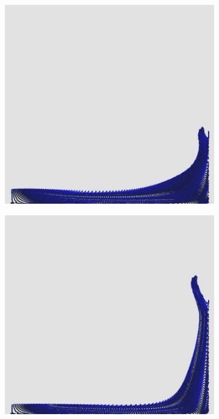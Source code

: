 \documentclass[12pt,a4paper,dvipsnames]{article}
\begin{document}
\begin{figure}[!ht]
\begin{subfigure}[!h]{0.3\textwidth}
	\end{subfigure}
	\begin{subfigure}[!h]{0.3\textwidth} \centering
		\includegraphics[width=\textwidth]{VDB/VDB-05.jpg}
	\end{subfigure}
	\begin{subfigure}[!h]{0.3\textwidth} \centering
		\includegraphics[width=\textwidth]{VDB/VDB-06.jpg}

\end{subfigure}
\end{figure}
\end{document}
